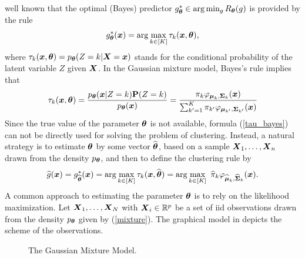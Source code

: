 well known that the optimal (Bayes) predictor $g^*_{\boldsymbol\theta} \in \arg\min_g R_{\boldsymbol\theta}(g)$ is provided by the rule
$$
g^*_{\boldsymbol\theta}(\boldsymbol x) = \arg\max_{k\in [K]} \tau_k(\boldsymbol x,{\boldsymbol\theta}),
$$
where $\tau_k(\boldsymbol x,{\boldsymbol\theta})=p_{{\boldsymbol\theta}}(Z=k|\boldsymbol X=\boldsymbol x)$ stands for the conditional probability of the latent variable $Z$ given $\boldsymbol X$.
In the Gaussian mixture model, Bayes's rule implies that
\begin{equation}
\label{tau_bayes}
\tau_k(\boldsymbol x,{\boldsymbol\theta})=\frac{p_{{\boldsymbol\theta}}(\boldsymbol x|Z=k)\mathbf P(Z=k)}{p_{{\boldsymbol\theta}}(\boldsymbol x)}
=\frac{\pi_k\varphi_{\boldsymbol\mu_k,\boldsymbol\Sigma_k}(\boldsymbol x)}{\sum_{k'=1}^K\pi_{k'}\varphi_{\boldsymbol\mu_{k'},\boldsymbol\Sigma_{k'}}(\boldsymbol x)}
\end{equation}
Since the true value of the parameter ${\boldsymbol\theta}$ is not available, formula (\ref{tau_bayes}) can not be
directly used for solving the problem of clustering. Instead, a natural strategy is to estimate ${\boldsymbol\theta}$
by some vector $\widehat{{\boldsymbol\theta}}$, based on a sample $\boldsymbol X_1,\ldots,\boldsymbol X_n$ drawn from the density $p_{\boldsymbol\theta}$, and
then to define the clustering rule by
\begin{equation}
\label{gen_clust}
\widehat g(\boldsymbol x) = g^*_{\widehat{{\boldsymbol\theta}}}(\boldsymbol x)=\arg\max_{k\in [K]} \tau_k(\boldsymbol x,\widehat{{\boldsymbol\theta}})=\arg\max_{k\in [K]}\
\widehat\pi_k\varphi_{\widehat{\boldsymbol\mu}_k,\widehat{\boldsymbol\Sigma}_k}(\boldsymbol x).
\end{equation}
A common approach to estimating the parameter ${\boldsymbol\theta}$ is to rely on the likelihood maximization. Let $\boldsymbol X_1,\dots,\boldsymbol X_N$ with $\boldsymbol X_i\in {\mathbb R}^p$ be a set of iid observations drawn from the density $p_{{\boldsymbol\theta}}$
given by (\ref{mixture}). The graphical model in \Cref{fig:graph_model_gmm_} depicts the scheme of the observations.
\begin{figure}
\centering\small
{}
\caption{The Gaussian Mixture Model.}
\label{fig:graph_model_gmm_}
\end{figure}
